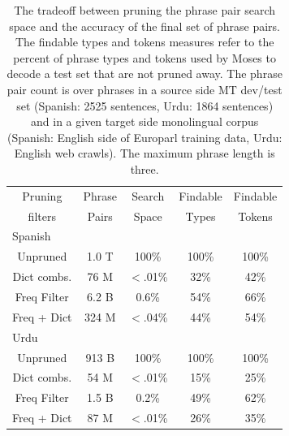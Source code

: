 \documentclass[11pt]{article}
\newcommand{\todo}[1]{\textcolor{red}{TODO: #1}}
\begin{document}
\begin{table}
\small
\begin{center}
\begin{tabular}{|c|c|c|c|c|}
\hline
Pruning 	& Phrase	& Search & 	Findable 	& Findable \\
filters	& Pairs	&  Space & Types 	&  Tokens \\
\hline
\hline
\multicolumn{5}{|l|}{Spanish} \\
\hline
Unpruned & 1.0 T & 100\% & 100\% & 100\% \\
Dict combs. & 76 M & $<$.01\% & 32\% & 42\% \\
Freq Filter &  6.2 B & 0.6\% & 54\% & 66\% \\
Freq + Dict & 324 M & $<$.04\% & 44\% & 54\% \\
\hline
\hline
\multicolumn{5}{|l|}{Urdu} \\
\hline
Unpruned & 913 B & 100\% & 100\% & 100\% \\
Dict combs. & 54 M & $<$.01\% & 15\% & 25\% \\
Freq Filter & 1.5 B & 0.2\% & 49\% & 62\% \\
Freq + Dict & 87 M & $<$.01\% & 26\% & 35\% \\
\hline
\end{tabular}
\caption{The tradeoff between pruning the phrase pair search space and the accuracy of the final set of phrase pairs. The findable types and tokens measures refer to the percent of phrase types and tokens used by Moses to decode a test set that are not pruned away. The phrase pair count is over phrases in a source side MT dev/test set (Spanish: 2525 sentences, Urdu: 1864 sentences) and in a given target side monolingual corpus (Spanish: English side of Europarl training data, Urdu: English web crawls). The maximum phrase length is three.}\label{table:prune}
\end{center}
\end{table}




\end{document}
